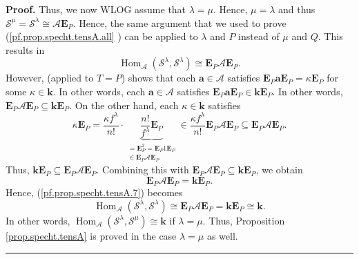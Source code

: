\documentclass[numbers=enddot,12pt,final,onecolumn,notitlepage]{scrartcl}%
\theoremstyle{definition}
\newenvironment{proof}[1][Proof]{\noindent\textbf{#1.} }{\ \rule{0.5em}{0.5em}}
\begin{document}
\begin{proof}
Thus, we now WLOG assume that $\lambda=\mu$. Hence, $\mu=\lambda$ and thus
$\mathcal{S}^{\mu}=\mathcal{S}^{\lambda}\cong\mathcal{A}\mathbf{E}_{P}$.
Hence, the same argument that we used to prove (\ref{pf.prop.specht.tensA.all}%
) can be applied to $\lambda$ and $P$ instead of $\mu$ and $Q$. This results
in%
\begin{equation}
\operatorname*{Hom}\nolimits_{\mathcal{A}}\left(  \mathcal{S}^{\lambda
},\mathcal{S}^{\lambda}\right)  \cong\mathbf{E}_{P}\mathcal{A}\mathbf{E}_{P}.
\label{pf.prop.specht.tensA.7}%
\end{equation}
However, \cite[Proposition 5.11.5]{sga} (applied to $T=P$) shows that each
$\mathbf{a}\in\mathcal{A}$ satisfies $\mathbf{E}_{P}\mathbf{aE}_{P}%
=\kappa\mathbf{E}_{P}$ for some $\kappa\in\mathbf{k}$. In other words, each
$\mathbf{a}\in\mathcal{A}$ satisfies $\mathbf{E}_{P}\mathbf{aE}_{P}%
\in\mathbf{kE}_{P}$. In other words, $\mathbf{E}_{P}\mathcal{A}\mathbf{E}%
_{P}\subseteq\mathbf{kE}_{P}$. On the other hand, each $\kappa\in\mathbf{k}$
satisfies
\[
\kappa\mathbf{E}_{P}=\dfrac{\kappa f^{\lambda}}{n!}\cdot\underbrace{\dfrac
{n!}{f^{\lambda}}\mathbf{E}_{P}}_{\substack{=\mathbf{E}_{P}^{2}=\mathbf{E}%
_{P}1\mathbf{E}_{P}\\\in\mathbf{E}_{P}\mathcal{A}\mathbf{E}_{P}}}\in
\dfrac{\kappa f^{\lambda}}{n!}\mathbf{E}_{P}\mathcal{A}\mathbf{E}_{P}%
\subseteq\mathbf{E}_{P}\mathcal{A}\mathbf{E}_{P}.
\]
Thus, $\mathbf{kE}_{P}\subseteq\mathbf{E}_{P}\mathcal{A}\mathbf{E}_{P}$.
Combining this with $\mathbf{E}_{P}\mathcal{A}\mathbf{E}_{P}\subseteq
\mathbf{kE}_{P}$, we obtain%
\[
\mathbf{E}_{P}\mathcal{A}\mathbf{E}_{P}=\mathbf{kE}_{P}.
\]
Hence, (\ref{pf.prop.specht.tensA.7}) becomes%
\[
\operatorname*{Hom}\nolimits_{\mathcal{A}}\left(  \mathcal{S}^{\lambda
},\mathcal{S}^{\lambda}\right)  \cong\mathbf{E}_{P}\mathcal{A}\mathbf{E}%
_{P}=\mathbf{kE}_{P}\cong\mathbf{k}.
\]
In other words, $\operatorname*{Hom}\nolimits_{\mathcal{A}}\left(
\mathcal{S}^{\lambda},\mathcal{S}^{\mu}\right)  \cong\mathbf{k}$ if
$\lambda=\mu$. Thus, Proposition \ref{prop.specht.tensA} is proved in the case
$\lambda=\mu$ as well.
\end{proof}
\end{document}
